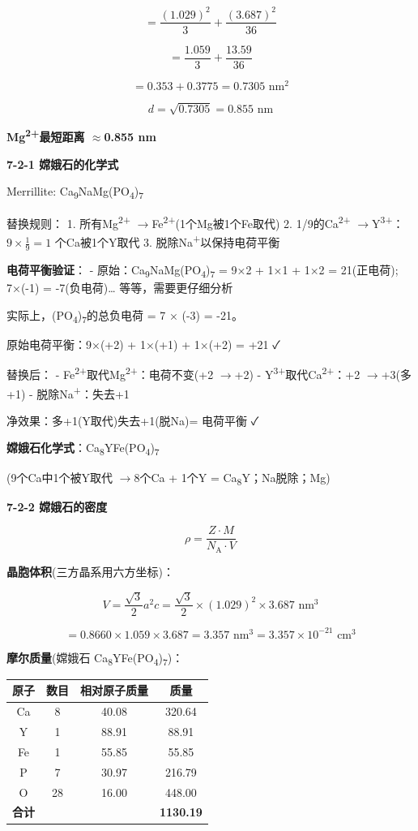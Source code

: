 \documentclass[a4paper,11pt]{ctexart}
\newcounter{none}
\newcommand{\箭}{\ensuremath{\rightarrow}}
\newcommand{\左箭}{\ensuremath{\leftarrow}}
\newcommand{\上箭}{\ensuremath{\uparrow}}
\newcommand{\下箭}{\ensuremath{\downarrow}}
\newcommand{\衡}{\ensuremath{\rightleftharpoons}}
\newcommand{\双箭}{\ensuremath{\leftrightarrow}}
\newcommand{\约等于}{\ensuremath{\approx}}
\newcommand{\小于等于}{\ensuremath{\leq}}
\newcommand{\大于等于}{\ensuremath{\geq}}
\newcommand{\不等于}{\ensuremath{\neq}}
\newcommand{\西格马}{\ensuremath{\sigma}}
\newcommand{\派}{\ensuremath{\pi}}
\begin{document}
\[= \frac{(1.029)^2}{3} + \frac{(3.687)^2}{36}\]

\[= \frac{1.059}{3} + \frac{13.59}{36}\]

\[= 0.353 + 0.3775 = 0.7305 \text{ nm}^2\]

\[d = \sqrt{0.7305} = 0.855 \text{ nm}\]

\textbf{Mg\textsuperscript{2+}最短距离 \约等于 0.855 nm}

\textbf{7-2-1 嫦娥石的化学式}

Merrillite: Ca\textsubscript{9}NaMg(PO\textsubscript{4})\textsubscript{7}

替换规则：
1. 所有Mg\textsuperscript{2+} \箭 Fe\textsuperscript{2+}(1个Mg被1个Fe取代)
2. 1/9的Ca\textsuperscript{2+} \箭 Y\textsuperscript{3+}：\(9 \times \frac{1}{9} = 1\) 个Ca被1个Y取代
3. 脱除Na\textsuperscript{+}以保持电荷平衡

\textbf{电荷平衡验证}：
- 原始：Ca\textsubscript{9}NaMg(PO\textsubscript{4})\textsubscript{7} = 9×2 + 1×1 + 1×2 = 21(正电荷); 7×(-1) = -7(负电荷)\ldots{} 等等，需要更仔细分析

实际上，(PO\textsubscript{4})\textsubscript{7}的总负电荷 = 7 × (-3) = -21。

原始电荷平衡：9×(+2) + 1×(+1) + 1×(+2) = +21 ✓

替换后：
- Fe\textsuperscript{2+}取代Mg\textsuperscript{2+}：电荷不变(+2 \箭 +2)
- Y\textsuperscript{3+}取代Ca\textsuperscript{2+}：+2 \箭 +3(多+1)
- 脱除Na\textsuperscript{+}：失去+1

净效果：多+1(Y取代)失去+1(脱Na)= 电荷平衡 ✓

\textbf{嫦娥石化学式}：Ca\textsubscript{8}YFe(PO\textsubscript{4})\textsubscript{7}

(9个Ca中1个被Y取代 \箭 8个Ca + 1个Y = Ca\textsubscript{8}Y；Na脱除；Mg)

\textbf{7-2-2 嫦娥石的密度}

\[\rho = \frac{Z \cdot M}{N_\mathrm{A} \cdot V}\]

\textbf{晶胞体积}(三方晶系用六方坐标)：

\[V = \frac{\sqrt{3}}{2} a^2 c = \frac{\sqrt{3}}{2} \times (1.029)^2 \times 3.687 \text{ nm}^3\]

\[= 0.8660 \times 1.059 \times 3.687 = 3.357 \text{ nm}^3 = 3.357 \times 10^{-21} \text{ cm}^3\]

\textbf{摩尔质量}(嫦娥石 Ca\textsubscript{8}YFe(PO\textsubscript{4})\textsubscript{7})：

{\def\LTcaptype{none} %
\begin{longtable}[]{@{}cccc@{}}
\toprule\noalign{}
原子 & 数目 & 相对原子质量 & 质量 \\
\midrule\noalign{}
\endhead
\bottomrule\noalign{}
\endlastfoot
Ca & 8 & 40.08 & 320.64 \\
Y & 1 & 88.91 & 88.91 \\
Fe & 1 & 55.85 & 55.85 \\
P & 7 & 30.97 & 216.79 \\
O & 28 & 16.00 & 448.00 \\
\textbf{合计} & & & \textbf{1130.19} \\
\end{longtable}
}
\end{document}

